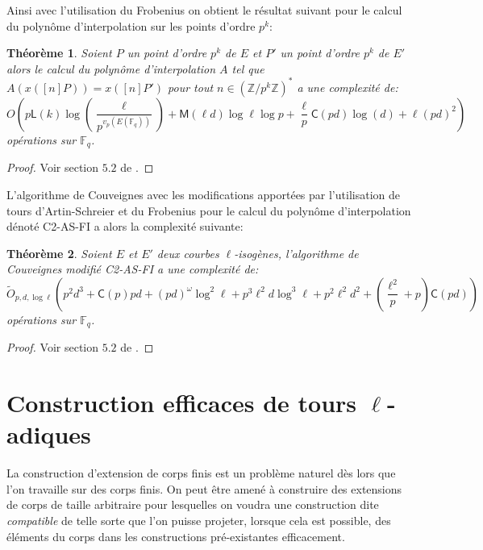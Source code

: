 \documentclass[10pt,a4paper]{book}
\theoremstyle{plain}
\newtheorem{thm}{Théorème}[chapter]
\theoremstyle{definition}
\theoremstyle{definition}
\theoremstyle{definition}
\theoremstyle{definition}
\theoremstyle{remark}
\theoremstyle{remark}
\theoremstyle{definition}
\begin{document}
Ainsi avec l'utilisation du Frobenius on obtient le résultat suivant pour le calcul du polynôme d'interpolation sur les points d'ordre $p^k$:

\begin{thm}
Soient $P$ un point d'ordre $p^k$ de $E$ et $P'$ un point d'ordre $p^k$ de $E'$ alors le calcul du polynôme d'interpolation $A$ tel que $A(x([n]P))=x([n]P')$ pour tout $n \in \left( \mathbb{Z}/p^k \mathbb{Z} \right)^*$ a une complexité de:
\[
O(p\mathsf{L}(k)\log(\frac{\ell}{p^{v_p(E(\mathbb{F}_q))}})+\mathsf{M}(\ell d)\log \ell \log p + \frac{\ell}{p}\mathsf{C}(pd)\log(d)+\ell (pd)^2)
\]
opérations sur $\mathbb{F}_q$.
\end{thm}

\begin{proof}
Voir section $5.2$ de \cite{DeFeo11}.
\end{proof}

L'algorithme de Couveignes avec les modifications apportées par l'utilisation de tours d'Artin-Schreier et du Frobenius pour le calcul du polynôme d'interpolation dénoté C2-AS-FI a alors la complexité suivante:

\begin{thm}
Soient $E$ et $E'$ deux courbes $\ell$-isogènes, l'algorithme de Couveignes modifié C2-AS-FI a une complexité de:
\[
\tilde{O}_{p,d,\log \ell}(p^2d^3+\mathsf{C}(p)pd+(pd)^{\omega}\log^2 \ell + p^3 \ell^2 d \log^3 \ell + p^2\ell^2d^2+(\frac{\ell^2}{p}+p)\mathsf{C}(pd))
\]
opérations sur $\mathbb{F}_q$.
\end{thm}

\begin{proof}
Voir section $5.2$ de \cite{DeFeo11}.
\end{proof}

\chapter{Construction efficaces de tours $\ell$-adiques}
\label{cha:tour}
La construction d'extension de corps finis est un problème naturel dès lors que l'on travaille sur des corps finis. On peut être amené à construire des extensions de corps de taille arbitraire pour lesquelles on voudra une construction dite \textit{compatible} de telle sorte que l'on puisse projeter, lorsque cela est possible, des éléments du corps dans les constructions pré-existantes efficacement.
\end{document}

